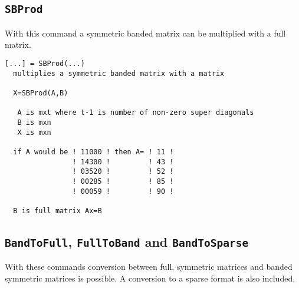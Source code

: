 \documentclass[11pt]{article}
\begin{document}
\subsection{\texttt{SBProd}}
With this command a symmetric banded matrix can be multiplied with a full
matrix.
\begin{verbatim}
[...] = SBProd(...)
  multiplies a symmetric banded matrix with a matrix

  X=SBProd(A,B)

   A is mxt where t-1 is number of non-zero super diagonals
   B is mxn
   X is mxn

  if A would be ! 11000 ! then A= ! 11 ! 
                ! 14300 !         ! 43 ! 
                ! 03520 !         ! 52 ! 
                ! 00285 !         ! 85 ! 
                ! 00059 !         ! 90 ! 

  B is full matrix Ax=B
\end{verbatim}
\subsection{\texttt{BandToFull}, \texttt{FullToBand} and \texttt{BandToSparse}}
With these commands conversion between full, symmetric matrices and banded
symmetric matrices is possible. A conversion to a sparse format is also
included.



%
%






\end{document}
